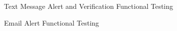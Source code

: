 \documentclass{report}
\begin{document}
\begin{figure}[H]
	\caption{Text Message Alert and Verification Functional Testing}
\end{figure}
\begin{figure}[H]
	\caption{Email Alert Functional Testing}
\end{figure}
\end{document}
